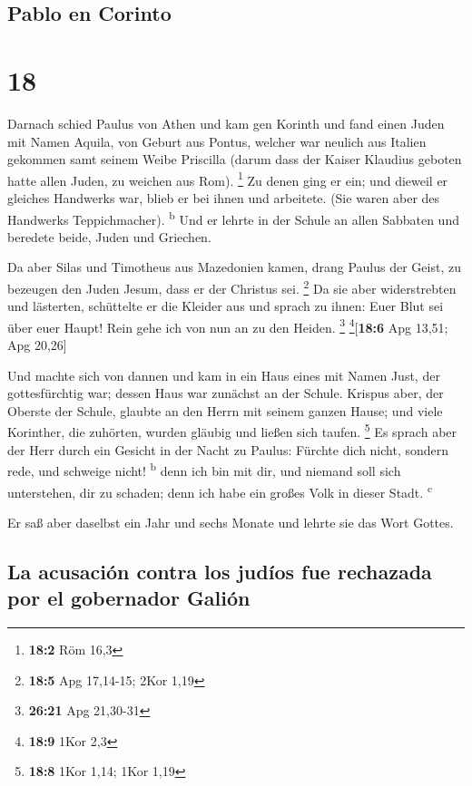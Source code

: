 \hypertarget{pablo-en-corinto}{%
\subsection{Pablo en Corinto}\label{pablo-en-corinto}}

\hypertarget{section-17}{%
\section{18}\label{section-17}}

 Darnach schied Paulus von Athen und kam gen Korinth
 und fand einen Juden mit Namen Aquila, von Geburt aus
Pontus, welcher war neulich aus Italien gekommen samt seinem Weibe
Priscilla (darum dass der Kaiser Klaudius geboten hatte allen Juden, zu
weichen aus Rom). \footnote{\textbf{18:2} Röm 16,3}  Zu
denen ging er ein; und dieweil er gleiches Handwerks war, blieb er bei
ihnen und arbeitete. (Sie waren aber des Handwerks Teppichmacher).
\textsuperscript{b}  Und er lehrte in der Schule an allen
Sabbaten und beredete beide, Juden und Griechen.

 Da aber Silas und Timotheus aus Mazedonien kamen, drang
Paulus der Geist, zu bezeugen den Juden Jesum, dass er der Christus sei.
\footnote{\textbf{18:5} Apg 17,14-15; 2Kor 1,19}  Da sie
aber widerstrebten und lästerten, schüttelte er die Kleider aus und
sprach zu ihnen: Euer Blut sei über euer Haupt! Rein gehe ich von nun an
zu den Heiden. \footnote{\textbf{26:21} Apg 21,30-31}
\footnote{\textbf{18:9} 1Kor 2,3}{[}\textbf{18:6} Apg 13,51; Apg
20,26{]}

 Und machte sich von dannen und kam in ein Haus eines mit
Namen Just, der gottesfürchtig war; dessen Haus war zunächst an der
Schule.  Krispus aber, der Oberste der Schule, glaubte an
den Herrn mit seinem ganzen Hause; und viele Korinther, die zuhörten,
wurden gläubig und ließen sich taufen. \footnote{\textbf{18:8} 1Kor
  1,14; 1Kor 1,19}  Es sprach aber der Herr durch ein
Gesicht in der Nacht zu Paulus: Fürchte dich nicht, sondern rede, und
schweige nicht! \textsuperscript{b}  denn ich bin mit
dir, und niemand soll sich unterstehen, dir zu schaden; denn ich habe
ein großes Volk in dieser Stadt. \textsuperscript{c}

 Er saß aber daselbst ein Jahr und sechs Monate und
lehrte sie das Wort Gottes.

\hypertarget{la-acusaciuxf3n-contra-los-juduxedos-fue-rechazada-por-el-gobernador-galiuxf3n}{%
\subsection{La acusación contra los judíos fue rechazada por el
gobernador
Galión}\label{la-acusaciuxf3n-contra-los-juduxedos-fue-rechazada-por-el-gobernador-galiuxf3n}}

